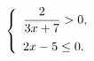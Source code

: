 \begin{ex}[type=ineq_system]
	\begin{condition}
		\( \left\{
		\begin{array}{l}
			\dfrac{2}{3x+7}>0,\vspace{2mm}\\
			2x-5\le0.
		\end{array}
		\right. \)
	\end{condition}
\end{ex}